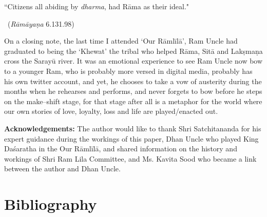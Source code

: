 \begin{myquote}
“Citizens all abiding by \textit{dharma}, had Rāma as their ideal." 

~\hfill (\textit{Rāmāyaṇa} 6.131.98)
\end{myquote}

On a closing note, the last time I attended ‘Our Rāmlīlā’, Ram Uncle had graduated to being the ‘Khewat’ the tribal who helped Rāma, Sitā and Lakṣmaṇa cross the Sarayū river. It was an emotional experience to see Ram Uncle now bow to a younger Ram, who is probably more versed in digital media, probably has his own twitter account, and yet, he chooses to take a vow of austerity during the months when he rehearses and performs, and never forgets to bow before he steps on the make–shift stage, for that stage after all is a metaphor for the world where our own stories of love, loyalty, loss and life are played/enacted out.

\textbf{Acknowledgements:} The author would like to thank Shri Satchitananda for his expert guidance during the workings of this paper, Dhan Uncle who played King Daśaratha in the Our Rāmlīlā, and shared information on the history and workings of Shri Ram Lila Committee, and Ms. Kavita Sood who became a link between the author and Dhan Uncle.


\section*{Bibliography}

